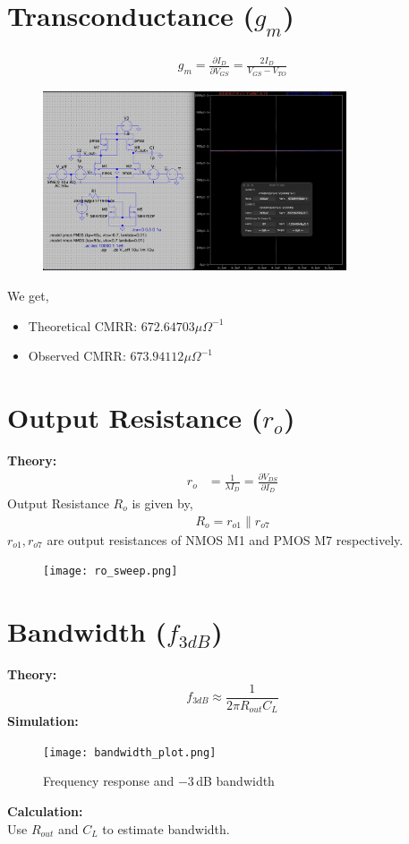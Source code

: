 \documentclass[12pt,a4paper]{article}
\begin{document}
\section{Transconductance ($g_m$)}
\begin{align*}
g_m = \frac{\partial I_D}{\partial V_{GS}}= \frac{2I_D}{V_{GS}-V_{TO}}
\end{align*}
\vspace{6pt}
\begin{figure}[H]
    \centering
    \includegraphics[width=0.8\textwidth]{figs/trans.png}
\end{figure}
We get,
\begin{itemize}
    \item Theoretical CMRR: $672.64703\mu \Omega^{-1}$
    \item Observed CMRR: $673.94112\mu\Omega^{-1}$
\end{itemize}

\vspace{10pt}
\section{Output Resistance ($r_o$)}
\textbf{Theory:}
\begin{align*}
    r_o &= \frac{1}{\lambda I_D} =  \frac{\partial V_{DS}}{\partial I_D}
\end{align*}
Output Resistance $R_o$ is given by, 
\begin{align*}
    R_o = r_{o1} \parallel r_{o7}
\end{align*}
$r_{o1}, r_{o7}$ are output resistances of NMOS M1 and PMOS M7 respectively.
\vspace{6pt}
\begin{figure}[H]
    \centering
    \texttt{[image: ro\_sweep.png]}
\end{figure}
\vspace{10pt}
\section{Bandwidth ($f_{3dB}$)}
\textbf{Theory:}
\[
f_{3dB} \approx \frac{1}{2 \pi R_{out} C_L}
\]
\vspace{6pt}
\textbf{Simulation:}
\begin{figure}[H]
    \centering
    \texttt{[image: bandwidth\_plot.png]}
    \caption{Frequency response and $-3$\,dB bandwidth}
\end{figure}
\vspace{6pt}
\textbf{Calculation:}\\
Use $R_{out}$ and $C_L$ to estimate bandwidth.
\end{document}
